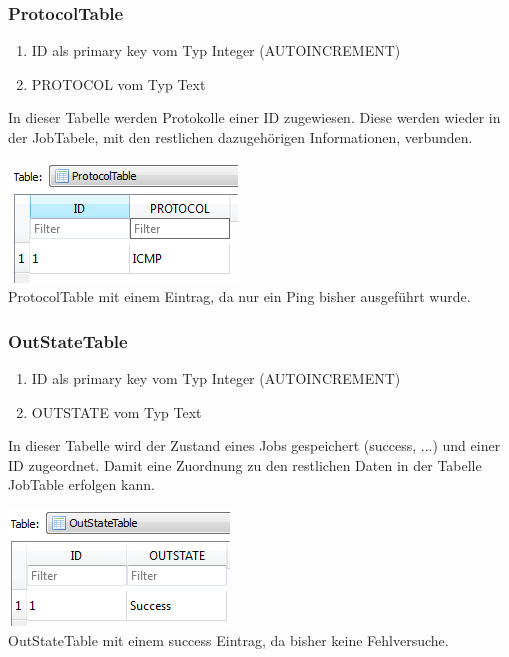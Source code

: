 \documentclass[12pt,a4paper]{report}
\begin{document}
\begin{onehalfspace}
\subsubsection{ProtocolTable}
\begin{enumerate}
\item ID als primary key vom Typ Integer (AUTOINCREMENT)
\item PROTOCOL vom Typ Text
\end{enumerate}
In dieser Tabelle werden Protokolle einer ID zugewiesen. Diese werden wieder in der JobTabele, mit den restlichen dazugehörigen Informationen, verbunden.
\begin{center}
\includegraphics[scale=0.8]{img/db-tb-protocol.png}\\
ProtocolTable mit einem Eintrag, da nur ein Ping bisher ausgeführt wurde.
\end{center}
\subsubsection{OutStateTable}
\begin{enumerate}
\item ID als primary key vom Typ Integer (AUTOINCREMENT)
\item OUTSTATE vom Typ Text
\end{enumerate}
In dieser Tabelle wird der Zustand eines Jobs gespeichert (success, ...) und einer ID zugeordnet. Damit eine Zuordnung zu den restlichen Daten in der Tabelle JobTable erfolgen kann.
\begin{center}
\includegraphics[scale=0.8]{img/db-tb-out.png}\\
OutStateTable mit einem success Eintrag, da bisher keine Fehlversuche.
\end{center}

\end{onehalfspace}
\end{document}
